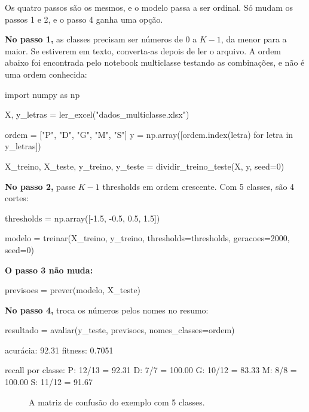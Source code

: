 \documentclass[11pt,a4paper]{article}
\newcommand{\code}[1]{\texttt{\detokenize{#1}}}
\newcommand{\cmcell}[5]{%
  \pgfmathsetmacro{\intens}{8+80*(#3/#4)}%
  \pgfmathsetmacro{\escuro}{ifthenelse(\intens>62,1,0)}%
  \ifdim\escuro pt>0.5pt\def\corval{white}\else\def\corval{tinta}\fi
  \node[draw=white,line width=1.2pt,fill=azul!\intens,minimum width=#5 cm,minimum height=#5 cm,
    inner sep=0pt,text=\corval,font=\small] at (#1*#5,-#2*#5) {#3};}
\begin{document}
Os quatro passos são os mesmos, e o modelo passa a ser ordinal. Só mudam os passos 1 e 2, e o passo 4 ganha uma opção.

\textbf{No passo 1,} as classes precisam ser números de 0 a $K-1$, da menor para a maior. Se estiverem em texto, converta-as depois de ler o arquivo. A ordem abaixo foi encontrada pelo notebook multiclasse testando as combinações, e não é uma ordem conhecida:

\begin{py}
import numpy as np

X, y_letras = ler_excel("dados_multiclasse.xlsx")

ordem = ["P", "D", "G", "M", "S"]
y = np.array([ordem.index(letra) for letra in y_letras])

X_treino, X_teste, y_treino, y_teste = dividir_treino_teste(X, y, seed=0)
\end{py}

\textbf{No passo 2,} passe $K-1$ thresholds em ordem crescente. Com 5 classes, são 4 cortes:

\begin{py}
thresholds = np.array([-1.5, -0.5, 0.5, 1.5])

modelo = treinar(X_treino, y_treino, thresholds=thresholds, geracoes=2000, seed=0)
\end{py}

\textbf{O passo 3 não muda:}

\begin{py}
previsoes = prever(modelo, X_teste)
\end{py}

\textbf{No passo 4,} \code{nomes_classes} troca os números pelos nomes no resumo:

\begin{py}
resultado = avaliar(y_teste, previsoes, nomes_classes=ordem)
\end{py}

\begin{saida}
acurácia: 92.31%
fitness: 0.7051

recall por classe:
  P: 12/13 = 92.31%
  D: 7/7 = 100.00%
  G: 10/12 = 83.33%
  M: 8/8 = 100.00%
  S: 11/12 = 91.67%
\end{saida}

\begin{figure}[H]
\centering
{}
\caption{A matriz de confusão do exemplo com 5 classes.}
\label{fig:confusao5}
\end{figure}
\end{document}
